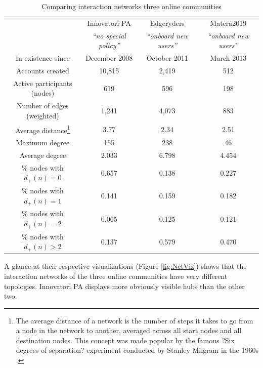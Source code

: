 \begin{table}[t]
\centering 
\begin{tabular}{| c | c | c | c |} 
\hline 
& Innovatori PA & Edgeryders & Matera2019\\ 
& \emph{``no special policy''} & \emph{``onboard new users''} & \emph{``onboard new users''}\\ 
\hline 
In existence since & December 2008 & October 2011 & March 2013 \\
Accounts created & 10,815 & 2,419 & 512 \\
\hline 
Active participants (nodes) & 619 & 596 & 198 \\
Number of edges (weighted) & 1,241 & 4,073 & 883 \\
\hline 
Average distance\footnote{The average distance of a network is the number of steps it takes to go from a node in the network to another, averaged across all start nodes and all destination nodes. This concept was made popular by the famous ?Six degrees of separation? experiment conducted by Stanley Milgram in the 1960s \cite{milgram1967small}.} & 3.77 & 2.34 & 2.51 \\
Maximum degree & 155 & 238 & 46 \\
Average degree & 2.033 & 6.798 & 4.454 \\
\hline 
\% nodes with $d_+(n) = 0$ & 0.657 & 0.138 & 0.227 \\
\% nodes with $d_+(n) = 1$ & 0.141 & 0.159 & 0.182 \\
\% nodes with $d_+(n) = 2$ & 0.065 & 0.125 & 0.121 \\
\% nodes with $d_+(n) > 2$ & 0.137 & 0.579 & 0.470 \\
\hline 
\end{tabular}
\caption{Comparing interaction networks three online communities}
\label{table:empiricalData}
\end{table}

A glance at their respective visualizations (Figure \ref{fig:NetViz}) shows that the interaction networks of the three online communities have very different topologies. Innovatori PA displays more obviously visible hubs than the other two. 

